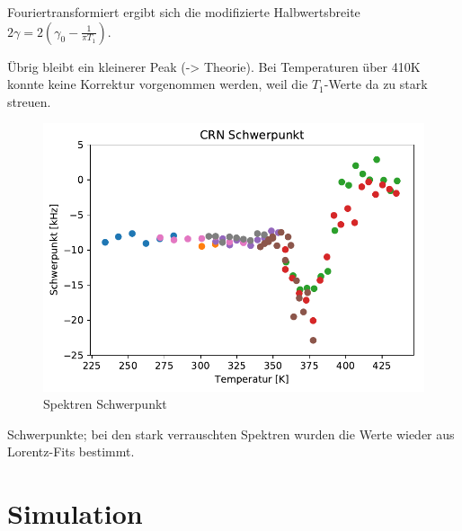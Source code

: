 Fouriertransformiert ergibt sich die modifizierte Halbwertsbreite $2\gamma = 2(\gamma_0 - \frac{1}{\pi T_1})$.

Übrig bleibt ein kleinerer Peak (-> Theorie). Bei Temperaturen über 410K konnte keine Korrektur vorgenommen werden, weil die $T_1$-Werte da zu stark streuen.


\begin{figure}
	\begin{center}
		\includegraphics[width=\textwidth]{graphics/plots/SPEK/spek_mean.pdf} 
	\end{center}
	\caption{Spektren Schwerpunkt} \label{fig:res:spek_mean}
\end{figure}
Schwerpunkte; bei den stark verrauschten Spektren wurden die Werte wieder aus Lorentz-Fits bestimmt.


\section{Simulation} \label{section:res:sim}

